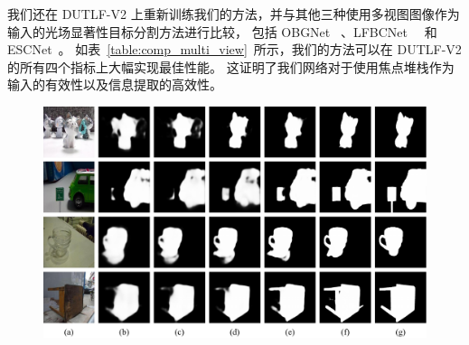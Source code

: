我们还在 DUTLF-V2 上重新训练我们的方法，并与其他三种使用多视图图像作为输入的光场显著性目标分割方法进行比较，
包括 OBGNet ~\cite{jing2021occlusion}、LFBCNet~\cite{wang2022lfbcnet}~ 和 ESCNet~\cite{zhang2022exploring}。 如表~\ref{table:comp_multi_view}~所示，我们的方法可以在 DUTLF-V2 的所有四个指标上大幅实现最佳性能。 这证明了我们网络对于使用焦点堆栈作为输入的有效性以及信息提取的高效性。 



\begin{figure}[t] 
	\includegraphics[width=0.99\linewidth]{figures/chapter3/self-comparsion-Use} 
	\centering
	\label{figure:self_comp}
\end{figure}



